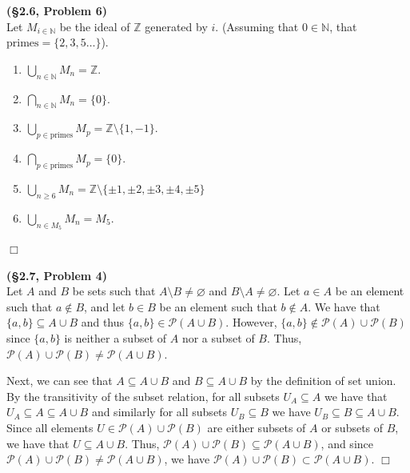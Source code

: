 \documentclass[12pt]{article}
\theoremstyle{definition}
\newenvironment{Solution}{\noindent {\sc Solution.}}{$\Box$ \vspace{2 ex}}
\begin{document}
\begin{Solution}
{\bf (\S2.6, Problem 6)}\\
Let $M_{i\in \mathbb{N}}$ be the ideal of $\mathbb{Z}$ generated by $i$. (Assuming that $0 \in \mathbb N$, that $\text{primes}=\{2,3,5\dots\}$).
\begin{enumerate}[label=\alph*.]
\item $\bigcup_{n\in \mathbb{N}} M_n = \mathbb Z$.
\item $\bigcap_{n\in \mathbb N} M_n = \{0\}$.
\item $\bigcup_{p\in \text{primes}} M_p = \mathbb Z \setminus \{1,-1\}$.
\item $\bigcap_{p\in \text{primes}} M_p = \{0\}$.
\item $\bigcup_{n\ge 6} M_n = \mathbb Z \setminus \{\pm 1,\pm 2, \pm 3, \pm 4,\pm 5\}$
\item $\bigcup_{n\in M_5} M_n = M_5$.
\end{enumerate}
\end{Solution} 

\begin{Solution}
{\bf (\S2.7, Problem 4)}\\
Let $A$ and $B$ be sets such that $A \setminus B \ne \varnothing$ and $B \setminus A\ne \varnothing$. Let $a\in A$ be an element such that $a \not \in B$, and let $b\in B$ be an element such that $b \not \in A$. We have that $\{a,b\} \subseteq A \cup B$ and thus $\{a,b\} \in \mathcal{P}(A \cup B)$. However, $\{a,b\} \not\in \mathcal{P}(A)\cup\mathcal P(B)$ since $\{a,b\}$ is neither a subset of $A$ nor a subset of $B$. Thus, $\mathcal{P}(A)\cup\mathcal P(B) \ne \mathcal{P}(A\cup B)$. 

Next, we can see that $A\subseteq A\cup B$ and $B\subseteq A\cup B$ by the definition of set union. By the transitivity of the subset relation, for all subsets $U_A \subseteq A$ we have that $U_A \subseteq A \subseteq A \cup B$ and similarly for all subsets $U_B \subseteq B$ we have $U_B \subseteq B \subseteq A\cup B$. Since all elements $U \in \mathcal P(A)\cup \mathcal P(B)$ are either subsets of $A$ or subsets of $B$, we have that $U\subseteq A \cup B$. Thus, $\mathcal P(A)\cup \mathcal P(B) \subseteq \mathcal P(A \cup B)$, and since $\mathcal{P}(A)\cup\mathcal P(B) \ne \mathcal{P}(A\cup B)$, we have $\mathcal P(A)\cup \mathcal P(B) \subset \mathcal P(A \cup B)$.
\end{Solution} 


\vspace{1cm}
\end{document}
